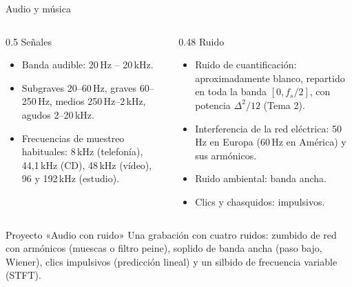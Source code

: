 \documentclass[aspectratio=169,11pt]{beamer}
\begin{document}
\begin{frame}{Audio y música}
  \begin{columns}[T]
    \begin{column}{0.5\textwidth}
      \alert{Señales}
      \begin{itemize}\small
        \item Banda audible: 20\,Hz – 20\,kHz.
        \item Subgraves 20–60\,Hz, graves 60–250\,Hz, medios 250\,Hz–2\,kHz, agudos 2–20\,kHz.
        \item Frecuencias de muestreo habituales: 8\,kHz (telefonía), 44,1\,kHz (CD), 48\,kHz (vídeo), 96 y 192\,kHz (estudio).
      \end{itemize}
    \end{column}
    \begin{column}{0.48\textwidth}
      \alert{Ruido}
      \begin{itemize}\small
        \item \alert{Ruido de cuantificación}: aproximadamente blanco, repartido en toda la banda $[0,f_s/2]$, con potencia $\Delta^2/12$ (Tema 2).
        \item Interferencia de la red eléctrica: 50\,Hz en Europa (60\,Hz en América) y sus armónicos.
        \item Ruido ambiental: banda ancha.
        \item Clics y chasquidos: impulsivos.
      \end{itemize}
    \end{column}
  \end{columns}
  \begin{block}{Proyecto «Audio con ruido»}
    \small Una grabación con cuatro ruidos: zumbido de red con armónicos (muescas o filtro peine), soplido de banda ancha (paso bajo, Wiener), clics impulsivos (predicción lineal) y un silbido de frecuencia variable (STFT).
  \end{block}
\end{frame}
\end{document}
